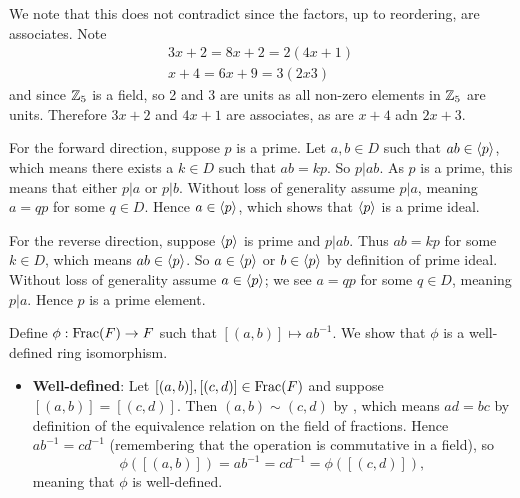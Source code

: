 \begin{questions}
    We note that this does not contradict  since the factors, up to reordering, are associates. Note
    \begin{align*}
        3x+2 = 8x+2 = 2(4x+1)\\
        x+4 = 6x+9 = 3(2x3)
    \end{align*}
    and since $\mathbb{Z}_5$ is a field, so 2 and 3 are units as all non-zero elements in $\mathbb{Z}_5$ are units. Therefore $3x+2$ and $4x+1$ are associates, as are $x+4$ adn $2x+3$.

    \item For the forward direction, suppose $p$ is a prime. Let $a, b \in D$ such that $ab \in \left\langle p\right\rangle$, which means there exists a $k \in D$ such that $ab = kp$. So $p \vert ab$. As $p$ is a prime, this means that either $p \vert a$ or $p \vert b$. Without loss of generality assume $p \vert a$, meaning $a = qp$ for some $q \in D$. Hence $a \in \left\langle p\right\rangle$, which shows that $\left\langle p\right\rangle$ is a prime ideal.

    For the reverse direction, suppose $\left\langle p\right\rangle$ is prime and $p \vert ab$. Thus $ab = kp$ for some $k \in D$, which means $ab \in \left\langle p\right\rangle$. So $a \in \left\langle p\right\rangle$ or $b \in \left\langle p\right\rangle$ by definition of prime ideal. Without loss of generality assume $a \in \left\langle p\right\rangle$; we see $a = qp$ for some $q \in D$, meaning $p \vert a$. Hence $p$ is a prime element.

    \item Define $\phi: \mathrm{Frac}(F) \to F$ such that $[(a,b)]\mapsto ab^{-1}$. We show that $\phi$ is a well-defined ring isomorphism.
    \begin{itemize}
        \item \textbf{Well-defined}: Let $[(a,b)], [(c,d)] \in \mathrm{Frac}(F)$ and suppose $[(a,b)] = [(c,d)]$. Then $(a,b) \mathrel{\sim} (c,d)$ by , which means $ad = bc$ by definition of the equivalence relation on the field of fractions. Hence $ab^{-1} = cd^{-1}$ (remembering that the operation is commutative in a field), so
        \[
            \phi([(a,b)]) = ab^{-1} = cd^{-1} = \phi([(c,d)]),
        \]
        meaning that $\phi$ is well-defined.


\end{itemize}
\end{questions}
